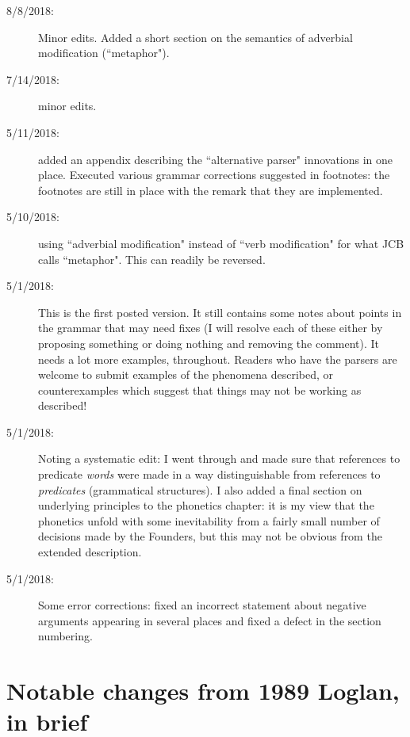 \documentclass[12pt]{book}
\begin{document}
\begin{description}
\item[8/8/2018:]  Minor edits.  Added a short section on the semantics of adverbial modification (``metaphor").

\item[7/14/2018:]  minor edits.



\item[5/11/2018:]  added an appendix describing the ``alternative parser" innovations in one place.  Executed various grammar corrections suggested in footnotes:  the footnotes are still in place with the remark that they are implemented.

\item[5/10/2018:]  using ``adverbial modification" instead of ``verb modification" for what JCB calls ``metaphor".  This can readily be reversed.

\item[5/1/2018:]  This is the first posted version.  It still contains some notes about points in the grammar that may need fixes (I will resolve each of these either by proposing something or doing nothing and removing the comment).  It needs a lot more examples, throughout.  Readers who have the parsers
are welcome to submit examples of the phenomena described, or counterexamples which suggest that things may not be working as described!

\item[5/1/2018:]  Noting a systematic edit:  I went through and made sure that references to predicate {\em words} were made in a way distinguishable from references to {\em predicates} (grammatical structures).  I also added a final section on underlying principles to the phonetics chapter:  it is my view that the phonetics unfold with some inevitability from a fairly small number of decisions made by the Founders, but this may not be obvious from the extended description.

\item[5/1/2018:]  Some error corrections:  fixed an incorrect statement about negative arguments appearing in several places and fixed a defect in the section numbering.











\end{description}

\newpage

\section{Notable changes from 1989 Loglan, in brief}
\end{document}
